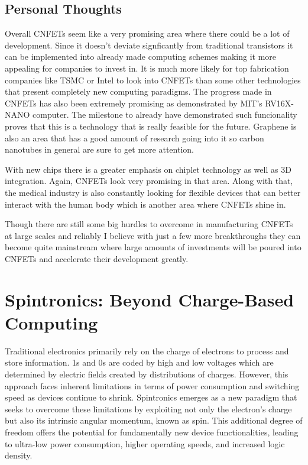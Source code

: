 \documentclass[sigconf]{acmart}
\begin{document}
\subsection{Personal Thoughts}
Overall CNFETs seem like a very promising area where there could be 
a lot of development. Since it doesn't deviate signficantly from 
traditional transistors it can be implemented into already made 
computing schemes making it more appealing for companies to invest 
in. It is much more likely for top fabrication companies like 
TSMC or Intel to look into CNFETs than some other technologies
that present completely new computing paradigms. The progress made in 
CNFETs has also been extremely promising as demonstrated by MIT's 
RV16X-NANO computer. The milestone to already have demonstrated 
such funcionality proves that this is a technology that is really 
feasible for the future. Graphene is also an area that has a good 
amount of research going into it so carbon nanotubes in general 
are sure to get more attention. 

With new chips there is a greater emphasis on chiplet technology 
as well as 3D integration. Again, CNFETs look very promising in that
area. Along with that, the medical industry is also constantly looking 
for flexible devices that can better interact with the human body 
which is another area where CNFETs shine in. 

Though there are still some big hurdles to overcome in manufacturing 
CNFETs at large scales and reliably I believe with just a few more 
breakthroughs they can become quite mainstream where large amounts 
of investments will be poured into CNFETs and accelerate their development 
greatly. 

\section{Spintronics: Beyond Charge-Based Computing}
Traditional electronics primarily rely on the charge of electrons 
to process and store information. 1s and 0s are coded by high and 
low voltages which are determined by electric fields created by
distributions of charges. However, this approach faces inherent 
limitations in terms of power consumption and switching speed as 
devices continue to shrink. Spintronics emerges as a new paradigm 
that seeks to overcome these limitations by exploiting not only the electron's 
charge but also its intrinsic angular momentum, known as spin. 
This additional degree of freedom offers the potential for 
fundamentally new device functionalities, leading to 
ultra-low power consumption, higher operating speeds, and increased 
logic density.
\end{document}
